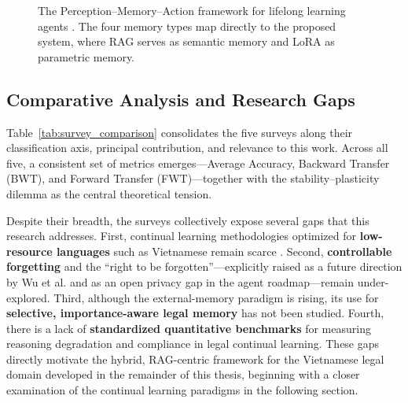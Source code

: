 \begin{figure}[H]
\centering
{}
\caption{The Perception--Memory--Action framework for lifelong learning agents \parencite{11328884}. The four memory types map directly to the proposed system, where RAG serves as semantic memory and LoRA as parametric memory.}
\label{fig:agent_memory}
\end{figure}

\subsection{Comparative Analysis and Research Gaps}
Table~\ref{tab:survey_comparison} consolidates the five surveys along their classification axis, principal contribution, and relevance to this work. Across all five, a consistent set of metrics emerges---Average Accuracy, Backward Transfer (BWT), and Forward Transfer (FWT)---together with the stability--plasticity dilemma as the central theoretical tension.

Despite their breadth, the surveys collectively expose several gaps that this research addresses. First, continual learning methodologies optimized for \textbf{low-resource languages} such as Vietnamese remain scarce \parencite{wu2024continuallearninglargelanguage, zheng2024lifelonglearninglargelanguage, 11328884}. Second, \textbf{controllable forgetting} and the ``right to be forgotten''---explicitly raised as a future direction by Wu et al. and as an open privacy gap in the agent roadmap---remain under-explored. Third, although the external-memory paradigm is rising, its use for \textbf{selective, importance-aware legal memory} has not been studied. Fourth, there is a lack of \textbf{standardized quantitative benchmarks} for measuring reasoning degradation and compliance in legal continual learning. These gaps directly motivate the hybrid, RAG-centric framework for the Vietnamese legal domain developed in the remainder of this thesis, beginning with a closer examination of the continual learning paradigms in the following section.

